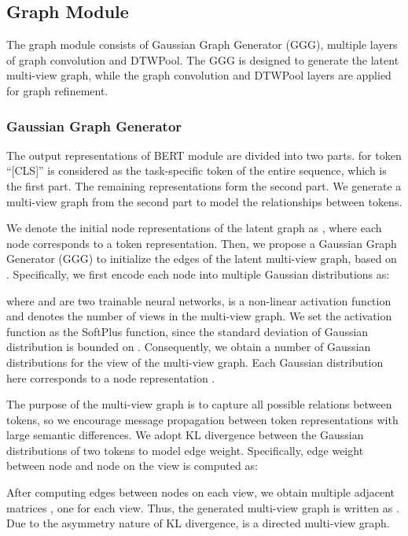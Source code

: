 \documentclass[letterpaper]{article} \usepackage{aaai21}  \usepackage{times}  \usepackage{helvet} \usepackage{courier}  \usepackage[hyphens]{url}  \usepackage{graphicx} \urlstyle{rm} \def\UrlFont{\rm}  \usepackage{graphicx}  \usepackage{natbib}  \usepackage{caption}
\begin{document}
\subsection{Graph Module}
The graph module consists of Gaussian Graph Generator (GGG), multiple layers of graph convolution and DTWPool. The GGG is designed to generate the latent multi-view graph, while the graph convolution and DTWPool layers are applied for graph refinement.

\subsubsection{Gaussian Graph Generator}
The output representations of BERT module are divided into two parts.  for token ``[CLS]'' is considered as the task-specific token of the entire sequence, which is the first part. The remaining representations  form the second part. We generate a multi-view graph from the second part to model the relationships between tokens. 



We denote the initial node representations of the latent graph as , where each node corresponds to a token representation. Then, we propose a Gaussian Graph Generator (GGG) to initialize the edges of the latent multi-view graph, based on . 
Specifically, we first encode each node  into multiple Gaussian distributions as:



where  and  are two trainable neural networks,  is a non-linear activation function and  denotes the number of views in the multi-view graph. We set the activation function  as the SoftPlus function, since the standard deviation of Gaussian distribution is bounded on . Consequently, we obtain a number of Gaussian distributions  for the  view of the multi-view graph. Each Gaussian distribution here  corresponds to a node representation .


The purpose of the multi-view graph is to capture all possible relations between tokens, so we encourage message propagation between token representations with large semantic differences. We adopt KL divergence between the Gaussian distributions of two tokens to model edge weight. Specifically, edge weight between  node and  node on the  view is computed as:

After computing edges between nodes on each view, we obtain multiple adjacent matrices , one for each view. Thus, the generated multi-view graph is written as . Due to the asymmetry nature of KL divergence,  is a directed multi-view graph.
\end{document}
